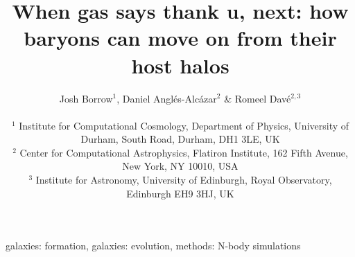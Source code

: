 \documentclass[fleqn,usenatbib]{mnras}
\title{When gas says thank u, next: how baryons can move on from their host halos}
\author[Borrow et al.]{
Josh Borrow$^{1}$,
Daniel Angl\'es-Alc\'azar$^{2}$ \&
Romeel Dav\'e$^{2, 3}$
\\
\\$^1$ Institute for Computational Cosmology, Department of Physics, University of Durham, South Road, Durham, DH1 3LE, UK
\\$^2$ Center for Computational Astrophysics, Flatiron Institute, 162 Fifth Avenue, New York, NY 10010, USA 
\\$^3$ Institute for Astronomy, University of Edinburgh, Royal Observatory, Edinburgh EH9 3HJ, UK
}
\begin{document}
\maketitle

\begin{abstract}\end{abstract}

\begin{keywords}galaxies: formation, galaxies: evolution, methods: N-body simulations\end{keywords}











\end{document}
